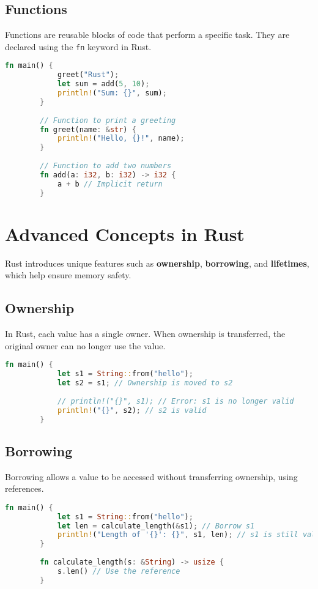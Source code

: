 \documentclass{article}
\begin{document}
	\subsection*{Functions}
	Functions are reusable blocks of code that perform a specific task. They are declared using the \texttt{fn} keyword in Rust.
	
	\begin{lstlisting}[language=Rust, caption={Functions in Rust}]
		fn main() {
			greet("Rust");
			let sum = add(5, 10);
			println!("Sum: {}", sum);
		}
		
		// Function to print a greeting
		fn greet(name: &str) {
			println!("Hello, {}!", name);
		}
		
		// Function to add two numbers
		fn add(a: i32, b: i32) -> i32 {
			a + b // Implicit return
		}
	\end{lstlisting}
	\newpage
	\section*{Advanced Concepts in Rust}
	Rust introduces unique features such as \textbf{ownership}, \textbf{borrowing}, and \textbf{lifetimes}, which help ensure memory safety.
	
	\subsection*{Ownership}
	In Rust, each value has a single owner. When ownership is transferred, the original owner can no longer use the value.
	
	\begin{lstlisting}[language=Rust, caption={Ownership in Rust}]
		fn main() {
			let s1 = String::from("hello");
			let s2 = s1; // Ownership is moved to s2
			
			// println!("{}", s1); // Error: s1 is no longer valid
			println!("{}", s2); // s2 is valid
		}
	\end{lstlisting}
	
	\subsection*{Borrowing}
	Borrowing allows a value to be accessed without transferring ownership, using references.
	
	\begin{lstlisting}[language=Rust, caption={Borrowing in Rust}]
		fn main() {
			let s1 = String::from("hello");
			let len = calculate_length(&s1); // Borrow s1
			println!("Length of '{}': {}", s1, len); // s1 is still valid
		}
		
		fn calculate_length(s: &String) -> usize {
			s.len() // Use the reference
		}
	\end{lstlisting}
	
\end{document}
